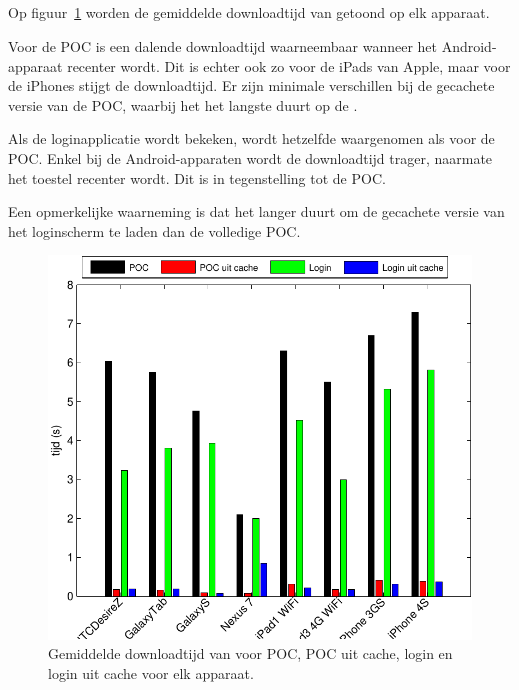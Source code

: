\subsection{\jqm}
Op figuur~\ref{fig:performantie-jqm} worden de gemiddelde downloadtijd van \jqm{} getoond op elk apparaat.

Voor de POC is een dalende downloadtijd waarneembaar wanneer het Android-apparaat recenter wordt.
Dit is echter ook zo voor de iPads van Apple, maar voor de iPhones stijgt de downloadtijd.
Er zijn minimale verschillen bij de gecachete versie van de POC, waarbij het het langste duurt op de \ipadi{}.

Als de loginapplicatie wordt bekeken, wordt hetzelfde waargenomen als voor de POC.
Enkel bij de Android-apparaten wordt de downloadtijd trager, naarmate het toestel recenter wordt.
Dit is in tegenstelling tot de POC.

Een opmerkelijke waarneming is dat het langer duurt om de gecachete versie van het loginscherm te laden dan de volledige POC.

\begin{figure}[H]
  \centering
  \includegraphics[width=\textwidth]{figuren/performance-jquery.pdf}
  \caption{Gemiddelde downloadtijd van \jqm{} voor POC,  POC uit cache, login en login uit cache voor elk apparaat.}
  \label{fig:performantie-jqm}
\end{figure}

\subsection{\lungo}

